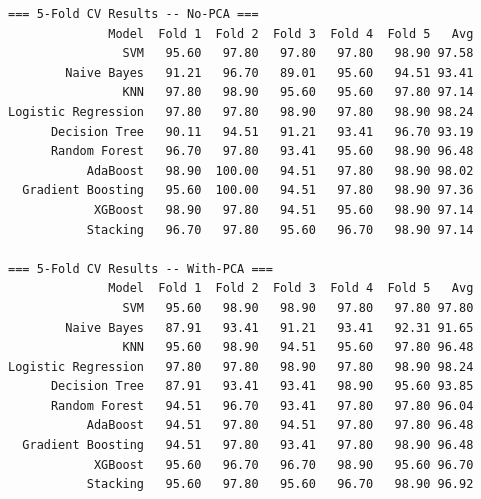 \documentclass[12pt,a4paper]{article}
\begin{document}
\begin{verbatim}
=== 5-Fold CV Results -- No-PCA ===
              Model  Fold 1  Fold 2  Fold 3  Fold 4  Fold 5   Avg
                SVM   95.60   97.80   97.80   97.80   98.90 97.58
        Naive Bayes   91.21   96.70   89.01   95.60   94.51 93.41
                KNN   97.80   98.90   95.60   95.60   97.80 97.14
Logistic Regression   97.80   97.80   98.90   97.80   98.90 98.24
      Decision Tree   90.11   94.51   91.21   93.41   96.70 93.19
      Random Forest   96.70   97.80   93.41   95.60   98.90 96.48
           AdaBoost   98.90  100.00   94.51   97.80   98.90 98.02
  Gradient Boosting   95.60  100.00   94.51   97.80   98.90 97.36
            XGBoost   98.90   97.80   94.51   95.60   98.90 97.14
           Stacking   96.70   97.80   95.60   96.70   98.90 97.14

=== 5-Fold CV Results -- With-PCA ===
              Model  Fold 1  Fold 2  Fold 3  Fold 4  Fold 5   Avg
                SVM   95.60   98.90   98.90   97.80   97.80 97.80
        Naive Bayes   87.91   93.41   91.21   93.41   92.31 91.65
                KNN   95.60   98.90   94.51   95.60   97.80 96.48
Logistic Regression   97.80   97.80   98.90   97.80   98.90 98.24
      Decision Tree   87.91   93.41   93.41   98.90   95.60 93.85
      Random Forest   94.51   96.70   93.41   97.80   97.80 96.04
           AdaBoost   94.51   97.80   94.51   97.80   97.80 96.48
  Gradient Boosting   94.51   97.80   93.41   97.80   98.90 96.48
            XGBoost   95.60   96.70   96.70   98.90   95.60 96.70
           Stacking   95.60   97.80   95.60   96.70   98.90 96.92


\end{verbatim}
\end{document}
